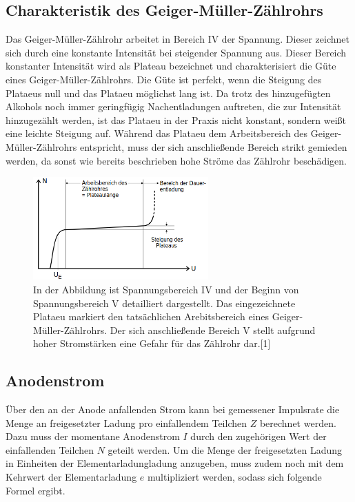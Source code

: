 \documentclass[titlepage = firstcover]{scrartcl}
\begin{document}
                \FloatBarrier
            

        \subsection{Charakteristik des Geiger-Müller-Zählrohrs}
            Das Geiger-Müller-Zählrohr arbeitet in Bereich IV der Spannung. Dieser zeichnet sich durch eine konstante Intensität bei steigender Spannung aus. Dieser Bereich konstanter Intensität
            wird als Plateau bezeichnet und charakterisiert die Güte eines Geiger-Müller-Zählrohrs. Die Güte ist perfekt, wenn die Steigung des Plataeus null und das Plataeu möglichst lang ist. Da 
            trotz des hinzugefügten Alkohols noch immer geringfügig Nachentladungen auftreten, die zur Intensität hinzugezählt werden, ist das Plataeu in der Praxis nicht konstant, sondern weißt eine 
            leichte Steigung auf. Während das Plataeu dem Arbeitsbereich des Geiger-Müller-Zählrohrs entspricht, muss der sich anschließende Bereich strikt gemieden werden, da sonst wie bereits 
            beschrieben hohe Ströme das Zählrohr beschädigen.

            \FloatBarrier

            \begin{figure}[h]
              \centering
              \includegraphics[width = 0.6\textwidth]{Bilder/SchemaCharakteristik.png}
              \caption{In der Abbildung ist Spannungsbereich IV und der Beginn von Spannungsbereich V detailliert dargestellt. Das eingezeichnete Plataeu markiert den tatsächlichen Arebitsbereich eines Geiger-Müller-Zählrohrs. Der sich anschließende Bereich V stellt aufgrund hoher Stromstärken eine Gefahr für das Zählrohr dar.[1]}
              \label{fig:SchemaCharakteristik}
            \end{figure}

            \FloatBarrier

        \subsection{Anodenstrom}
            Über den an der Anode anfallenden Strom kann bei gemessener Impulsrate die Menge an freigesetzter Ladung pro einfallendem Teilchen $Z$ berechnet werden. Dazu muss der momentane Anodenstrom
            $I$ durch den zugehörigen Wert der einfallenden Teilchen $N$ geteilt werden. Um die Menge der freigesetzten Ladung in Einheiten der Elementarladungladung anzugeben, muss zudem noch 
            mit dem Kehrwert der Elementarladung $e$ multipliziert werden, sodass sich folgende Formel ergibt.
\end{document}
